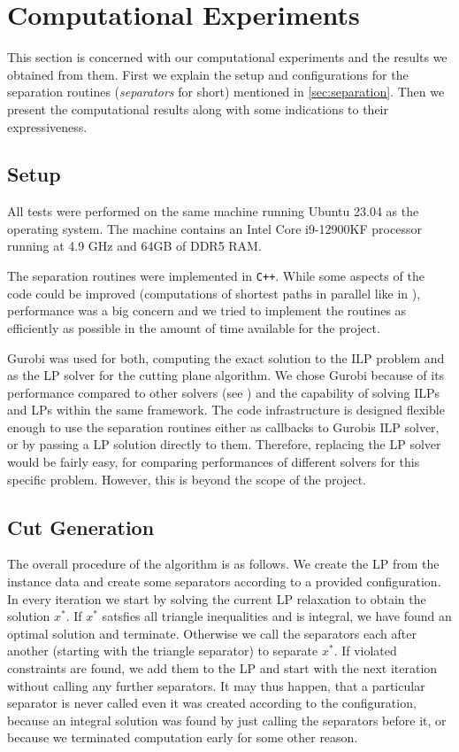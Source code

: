 \section{Computational Experiments}\label{sec:experiments}
This section is concerned with our computational experiments and the results we obtained from them.
First we explain the setup and configurations for the separation routines (\textit{separators} for short) mentioned in \cref{sec:separation}.
Then we present the computational results along with some indications to their expressiveness.

\subsection{Setup}\label{subsec:experiments_setup}
All tests were performed on the same machine running Ubuntu 23.04 as the operating system.
The machine contains an Intel Core i9-12900KF processor running at 4.9 GHz and 64GB of DDR5 RAM. 

The separation routines were implemented in \texttt{C++}.
While some aspects of the code could be improved (\eg computations of shortest paths in parallel like in \cite{sorensenSeparationHeuristic2Partition2020}),
performance was a big concern and we tried to implement the routines as efficiently as possible in the amount of time available for the project.

Gurobi \cite{gurobioptimizationllcGurobiOptimizerReference2023} was used for both, computing the exact solution to the ILP problem and as the LP solver for the cutting plane algorithm.
We chose Gurobi because of its performance compared to other solvers (see \cite{meindlAnalysisCommercialFree2012}) and the capability of solving ILPs and LPs within the same framework.
The code infrastructure is designed flexible enough to use the separation routines either as callbacks to Gurobis ILP solver, or by passing a LP solution directly to them.
Therefore, replacing the LP solver would be fairly easy, \eg for comparing performances of different solvers for this specific problem.
However, this is beyond the scope of the project.

\subsection{Cut Generation}\label{subsec:cut_generation}
The overall procedure of the algorithm is as follows.
We create the LP from the instance data and create some separators according to a provided configuration.
In every iteration we start by solving the current LP relaxation to obtain the solution $x^{*}$.
If $x^{*}$ satsfies all triangle inequalities and is integral, we have found an optimal solution and terminate.
Otherwise we call the separators each after another (starting with the triangle separator) to separate $x^{*}$.
If violated constraints are found, we add them to the LP and start with the next iteration without calling any further separators.
It may thus happen, that a particular separator is never called even it was created according to the configuration,
\eg because an integral solution was found by just calling the separators before it, or because we terminated computation early for some other reason.

